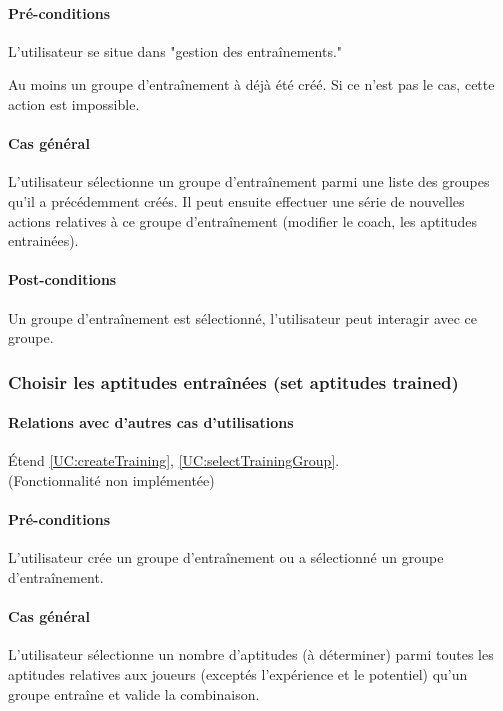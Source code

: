 \paragraph{Pré-conditions}
\begin{list}{}{\leftmargin=1.5em}
\item{L'utilisateur se situe dans "gestion des entraînements."}
\item{Au moins un groupe d'entraînement à déjà été créé. Si ce n'est pas le cas, cette action est impossible.}
\end{list}
\paragraph{Cas général}
L'utilisateur sélectionne un groupe d'entraînement parmi une liste des groupes qu'il a précédemment créés. Il peut ensuite effectuer une série de nouvelles actions relatives à ce groupe d'entraînement (modifier le coach, les aptitudes entrainées).
\paragraph{Post-conditions}
\begin{list}{}{\leftmargin=1.5em}
\item{Un groupe d'entraînement est sélectionné, l'utilisateur peut interagir avec ce groupe.}
\end{list}

\subsubsection{Choisir les aptitudes entraînées (set aptitudes trained)}
\label{UC:chooseAptitudesTrained}
\paragraph{Relations avec d'autres cas d'utilisations}
Étend \ref{UC:createTraining}, \ref{UC:selectTrainingGroup}.
\\(Fonctionnalité non implémentée)
\paragraph{Pré-conditions}
\begin{list}{}{\leftmargin=1.5em}
\item{L'utilisateur crée un groupe d'entraînement ou a sélectionné un groupe d'entraînement.}
\end{list}
\paragraph{Cas général}
L'utilisateur sélectionne un nombre d'aptitudes (à déterminer) parmi toutes les aptitudes relatives aux joueurs (exceptés l'expérience et le potentiel) qu'un groupe entraîne et valide la combinaison. 
